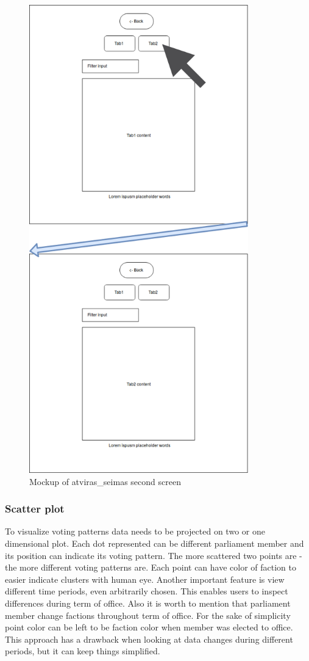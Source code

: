 \documentclass[a4paper,12pt]{article}
\begin{document}
	\begin{figure}[H]	
		\centering
		\includegraphics[width=9.5cm]{images/frontend_mockup_crop_2.png}
		\caption{Mockup of \gls{atviras_seimas} second screen}
		\label{fig:frontend_mockup_2}
	\end{figure}
	
	\subsubsection{Scatter plot}
	
	To visualize voting patterns data needs to be projected on two or one dimensional plot. Each dot represented can be different parliament member and its position can indicate its voting pattern. The more scattered two points are - the more different voting patterns are. Each point can have color of faction to easier indicate clusters with human eye. Another important feature is view different time periods, even arbitrarily chosen. This enables users to inspect differences during term of office.   
	Also it is worth to mention that parliament member change factions throughout term of office. For the sake of simplicity point color can be left to be faction color when member was elected to office. This approach has a drawback when looking at data changes during different periods, but it can keep things simplified.
	
\end{document}
